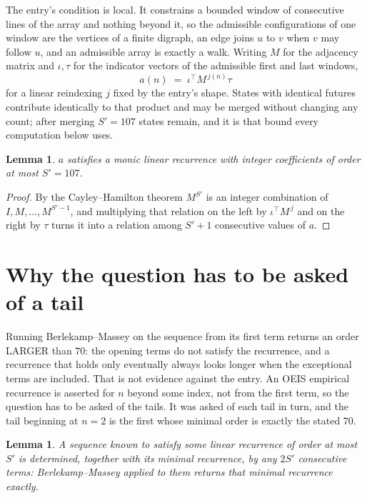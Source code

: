 \documentclass[11pt,a4paper]{article}
\theoremstyle{plain}
\newtheorem{lemma}[theorem]{Lemma}
\theoremstyle{definition}
\begin{document}
The entry's condition is local. It constrains a bounded window of consecutive lines of the
array and nothing beyond it, so the admissible configurations of one window are the vertices of
a finite digraph, an edge joins $u$ to $v$ when $v$ may follow $u$, and an admissible array is
exactly a walk. Writing $M$ for the adjacency matrix and $\iota,\tau$ for the indicator vectors
of the admissible first and last windows,
\[
a(n)\;=\;\iota^{\!\top}M^{\,j(n)}\tau
\]
for a linear reindexing $j$ fixed by the entry's shape. States with identical futures
contribute identically to that product and may be merged without changing any count; after
merging $S'=107$ states remain, and it is that bound every computation below uses.

\begin{lemma}\label{lem:cf}
$a$ satisfies a monic linear recurrence with integer coefficients of order at most $S'=107$.
\end{lemma}

\begin{proof}
By the Cayley--Hamilton theorem $M^{S'}$ is an integer combination of $I,M,\dots,M^{S'-1}$,
and multiplying that relation on the left by $\iota^{\!\top}M^{\,j}$ and on the right by
$\tau$ turns it into a relation among $S'+1$ consecutive values of $a$.
\end{proof}

\section{Why the question has to be asked of a tail}

Running Berlekamp--Massey on the sequence from its first term returns an order LARGER than $70$: the opening terms do not satisfy the recurrence, and a recurrence that holds only eventually always looks longer when the exceptional terms are included. That is not evidence against the entry. An OEIS empirical recurrence is asserted for $n$ beyond some index, not from the first term, so the question has to be asked of the tails. It was asked of each tail in turn, and the tail beginning at $n=2$ is the first whose minimal order is exactly the stated $70$.

\begin{lemma}\label{lem:bm}
A sequence known to satisfy some linear recurrence of order at most $S'$ is determined,
together with its minimal recurrence, by any $2S'$ consecutive terms: Berlekamp--Massey applied
to them returns that minimal recurrence exactly.
\end{lemma}
\end{document}
